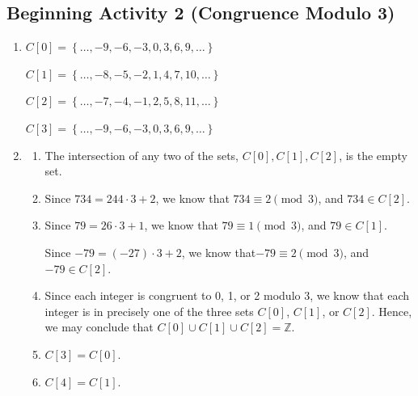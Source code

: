 \documentclass[11pt]{article}
\begin{document}
\subsection*{Beginning Activity 2 (Congruence Modulo 3)}
\begin{enumerate}
\item \begin{multicols}{2}
$C\left[ 0 \right] = \left\{ { \ldots ,  - 9,  - 6,  - 3, 0, 3, 6, 9,  \ldots } \right\}$	

$C\left[ 1 \right] = \left\{ { \ldots ,  - 8,  - 5,  - 2, 1, 4, 7, 10,  \ldots } \right\}$

$C\left[ 2 \right] = \left\{ { \ldots ,  - 7,  - 4,  - 1, 2, 5, 8, 11,  \ldots } \right\}$	

$C\left[ 3 \right] = \left\{ { \ldots ,  - 9,  - 6,  - 3, 0, 3, 6, 9,  \ldots } \right\}$
\end{multicols}

\item \begin{enumerate}
\item The intersection of any two of the sets, $C\left[ 0 \right], C\left[ 1 \right], C\left[ 2 \right]$, is the empty set.

\item Since $734 = 244 \cdot 3 + 2$, we know that  $734 \equiv 2 \pmod 3$, and  
$734 \in C\left[ 2 \right]$.

\item Since $79 = 26 \cdot 3 + 1$, we know that $79 \equiv 1 \pmod 3$, and  
$79 \in C\left[ 1 \right]$.

Since $ - 79 = \left( { - 27} \right) \cdot 3 + 2$,  we know that$ - 79 \equiv 2 \pmod 3$, and  $ - 79 \in C\left[ 2 \right]$.

\item Since each integer is congruent to  0, 1, or  2  modulo 3, we know that each integer is in precisely one of the three sets  $C\left[ 0 \right]$, $C\left[ 1 \right]$, or 
$C\left[ 2 \right]$.  Hence, we may conclude that 
$C\left[ 0 \right] \cup C\left[ 1 \right] \cup C\left[ 2 \right] = \mathbb{Z}$.

\item $C[3] = C[0]$.
\item $C[4] = C[1]$.
\end{enumerate}

\end{enumerate}
\hbreak
\end{document}
